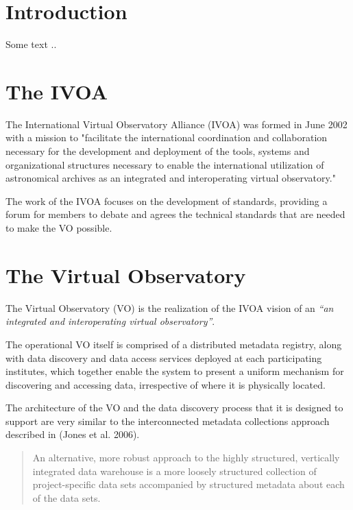 \documentclass{article}
\begin{document}
\section{Introduction}

Some text ..

\section{The IVOA}

The International Virtual Observatory Alliance (IVOA) was formed in June 2002
with a mission to "facilitate the international coordination and collaboration
necessary for the development and deployment of the tools, systems and
organizational structures necessary to enable the international utilization of
astronomical archives as an integrated and interoperating virtual observatory."

The work of the IVOA focuses on the development of standards, providing a forum
for members to debate and agrees the technical standards that are needed to make
the VO possible.

\section{The Virtual Observatory}

The Virtual Observatory (VO) is the realization of the IVOA vision of an
\textit{``an integrated and interoperating virtual observatory''}.

The operational VO itself is comprised of a distributed metadata registry, along
with data discovery and data access services deployed at each participating
institutes, which together enable the system to present a uniform mechanism for
discovering and accessing data, irrespective of where it is physically located.

The architecture of the VO and the data discovery process that it is designed to
support are very similar to the interconnected metadata collections approach
described in (Jones et al. 2006).

\begin{quote}
An alternative, more robust approach to the highly structured, vertically integrated
data warehouse is a more loosely structured collection of project-specific data sets
accompanied by structured metadata about each of the data sets.
\end{quote}
\end{document}

